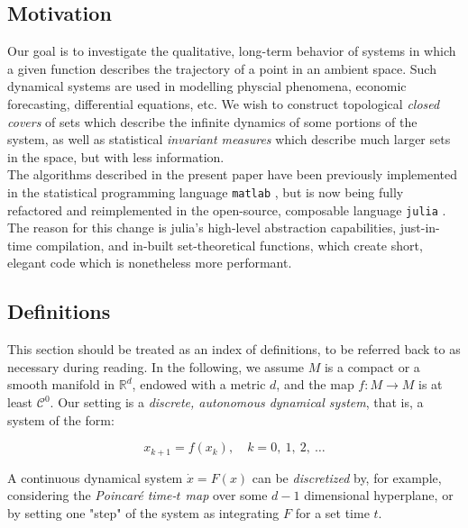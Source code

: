
\subsection{Motivation}

Our goal is to investigate the qualitative, long-term behavior of systems in which a given 
function describes the trajectory of a point in an ambient space. Such dynamical systems 
are used in modelling physcial phenomena, economic forecasting, differential equations, etc. 
We wish to construct topological \emph{closed covers} of sets which describe the infinite 
dynamics of some portions of the system, as well as statistical \emph{invariant measures} 
which describe much larger sets in the space, but with less information. \\

The algorithms described in the present paper have been previously implemented in the 
statistical programming language \texttt{matlab} \cite*{oldGAIO}, but is now being fully refactored and
reimplemented in the open-source, composable language \texttt{julia} \cite*{julia}. The reason for this 
change is julia's high-level abstraction capabilities, just-in-time compilation, and 
in-built set-theoretical functions, which create short, elegant code which is nonetheless 
more performant.

\subsection{Definitions}

This section should be treated as an index of definitions, to be referred back to as 
necessary during reading. In the following, we assume $M$ is a compact or a smooth manifold 
in $\mathbb{R}^d$, endowed with a metric $d$, and the 
map $f: M \rightarrow M$ is at least $\mathcal{C}^0$. Our setting is a 
\emph{discrete, autonomous dynamical system}, that is, a system of the form:

\begin{equation}
    x_{k+1} = f(x_k), \quad k = 0,\ 1,\ 2,\ \dotsc
\end{equation}

A continuous dynamical system $\dot{x} = F(x)$ can be \emph{discretized} by, for example,
considering the \emph{Poincaré time-$t$ map} over some $d-1$ dimensional hyperplane,
or by setting one "step" of the system as integrating $F$ for a set time $t$. \\

